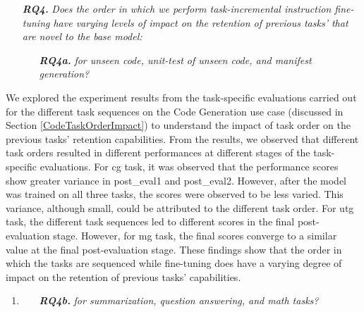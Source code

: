 \newcommand{\RQfour}{Does the order in which we perform task-incremental instruction fine-tuning have varying levels of impact on the retention of previous tasks’ that are novel to the base model:}
\newcommand{\RQfoura}{for unseen code, unit-test of unseen code, and manifest generation?}

\begin{enumerate}
    \item[\textit{\textbf{RQ4.}}] \textit{\RQfour}
    \begin{enumerate}
        \item[\textit{\textbf{RQ4a.}}] \textit{\RQfoura}
    \end{enumerate}
\end{enumerate}

We explored the experiment results from the task-specific evaluations carried out for the different task sequences on the Code Generation use case (discussed in Section \ref{CodeTaskOrderImpact}) to understand the impact of task order on the previous tasks’ retention capabilities. From the results, we observed that different task orders resulted in different performances at different stages of the task-specific evaluations. For cg task, it was observed that the performance scores show greater variance in post\_eval1 and post\_eval2. However, after the model was trained on all three tasks, the scores were observed to be less varied. This variance, although small, could be attributed to the different task order. For utg task, the different task sequences led to different scores in the final post-evaluation stage. However, for mg task, the final scores converge to a similar value at the final post-evaluation stage. These findings show that the order in which the tasks are sequenced while fine-tuning does have a varying degree of impact on the retention of previous tasks' capabilities. 

\newcommand{\RQfourb}{for summarization, question answering, and math tasks?}

\begin{enumerate}
\item  
    \begin{enumerate}
        \item[\textit{\textbf{RQ4b.}}] \textit{\RQfourb}
    \end{enumerate}
\end{enumerate}

